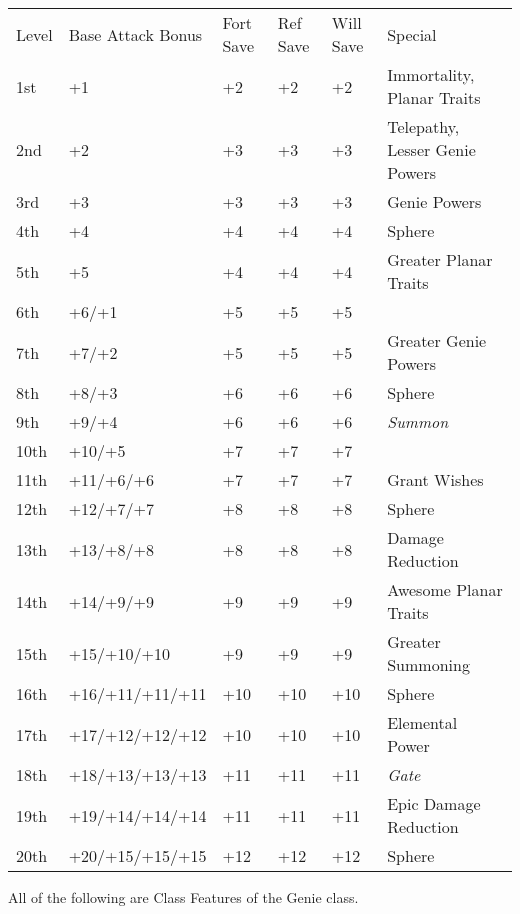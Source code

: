 \begin{table}[tbh]
\begin{small}
\begin{tabular}{lp{3.5cm}p{0.7cm}p{0.7cm}p{0.7cm}l}
Level &Base Attack Bonus &Fort Save &Ref Save &Will Save &Special\\
1st &+1 &+2 &+2 &+2 &Immortality, Planar Traits\\
2nd &+2 &+3 &+3 &+3 &Telepathy, Lesser Genie Powers\\
3rd &+3 &+3 &+3 &+3 &Genie Powers\\
4th &+4 &+4 &+4 &+4 &Sphere\\
5th &+5 &+4 &+4 &+4 &Greater Planar Traits\\
6th &+6/+1 &+5 &+5 &+5 &\\
7th &+7/+2 &+5 &+5 &+5 &Greater Genie Powers\\
8th &+8/+3 &+6 &+6 &+6 &Sphere\\
9th &+9/+4 &+6 &+6 &+6 &\textit{Summon}\\
10th &+10/+5 &+7 &+7 &+7 &\\
11th &+11/+6/+6 &+7 &+7 &+7 &Grant Wishes\\
12th &+12/+7/+7 &+8 &+8 &+8 &Sphere\\
13th &+13/+8/+8 &+8 &+8 &+8 &Damage Reduction\\
14th &+14/+9/+9 &+9 &+9 &+9 &Awesome Planar Traits\\
15th &+15/+10/+10 &+9 &+9 &+9 &Greater Summoning\\
16th &+16/+11/+11/+11 &+10 &+10 &+10 &Sphere\\
17th &+17/+12/+12/+12 &+10 &+10 &+10 &Elemental Power\\
18th &+18/+13/+13/+13 &+11 &+11 &+11 &\textit{Gate}\\
19th &+19/+14/+14/+14 &+11 &+11 &+11 &Epic Damage Reduction\\
20th &+20/+15/+15/+15 &+12 &+12 &+12 &Sphere\\
\end{tabular}
\end{small}
\end{table}

\smallskip\noindent All of the following are Class Features of the Genie class.



